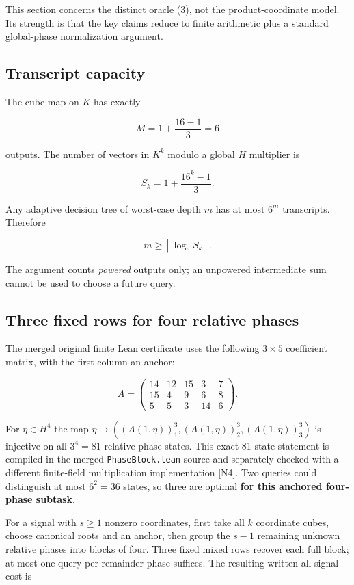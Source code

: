 \documentclass[
  10pt,
]{article}
\begin{document}
This section concerns the distinct oracle (3), not the
product-coordinate model. Its strength is that the key claims reduce to
finite arithmetic plus a standard global-phase normalization argument.

\subsection{Transcript capacity}\label{transcript-capacity}

The cube map on \(K\) has exactly

\[M=1+\frac{16-1}{3}=6\]

outputs. The number of vectors in \(K^k\) modulo a global \(H\)
multiplier is

\[S_k=1+\frac{16^k-1}{3}. \tag{18}\]

Any adaptive decision tree of worst-case depth \(m\) has at most \(6^m\)
transcripts. Therefore

\[
\boxed{m\ge\left\lceil\log_6 S_k\right\rceil.} \tag{19}
\]

The argument counts \emph{powered} outputs only; an unpowered
intermediate sum cannot be used to choose a future query.

\subsection{Three fixed rows for four relative
phases}\label{three-fixed-rows-for-four-relative-phases}

The merged original finite Lean certificate uses the following
\(3\times5\) coefficient matrix, with the first column an anchor:

\[
A=\begin{pmatrix}
14&12&15&3&7\\
15&4&9&6&8\\
5&5&3&14&6
\end{pmatrix}. \tag{20}
\]

For \(\eta\in H^4\) the map
\(\eta\mapsto((A(1,\eta))_1^3,(A(1,\eta))_2^3,(A(1,\eta))_3^3)\) is
injective on all \(3^4=81\) relative-phase states. This exact 81-state
statement is compiled in the merged \texttt{PhaseBlock.lean} source and
separately checked with a different finite-field multiplication
implementation {[}N4{]}. Two queries could distinguish at most
\(6^2=36\) states, so three are optimal \textbf{for this anchored
four-phase subtask}.

For a signal with \(s\ge1\) nonzero coordinates, first take all \(k\)
coordinate cubes, choose canonical roots and an anchor, then group the
\(s-1\) remaining unknown relative phases into blocks of four. Three
fixed mixed rows recover each full block; at most one query per
remainder phase suffices. The resulting written all-signal cost is
\end{document}
